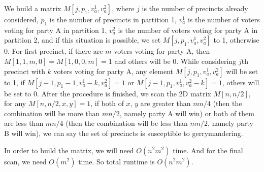 \documentclass[letter,12pt]{article}
\begin{document}
We build a matrix $M[j, p_1, v_a^1, v_a^2]$, where $j$ is the number of
precincts already considered, $p_1$ is the number of precincts in partition
1, $v_a^1$ is the number of voters voting for party A in partition 1,  
$v_a^2$ is the number of voters voting for party A in partition 2, and if
this situation is possible, we set $M[j, p_1, v_a^1, v_a^2]$ to 1, otherwise
0. For first precinct, if there are $m$ voters voting for party A, then 
$M[1, 1, m, 0]=M[1, 0, 0, m] = 1$ and others will be 0. While considering
$j$th precinct with $k$ voters voting for party A, any element 
$M[j, p_1, v_a^1, v_a^2]$ will be set to 1, if $M[j-1, p_1-1,v_a^1-k, 
v_a^2]=1$ or $M[j-1,p_1, v_a^1,v_a^2-k]=1$, others will be set to 0.
After the procedure is finished, we scan the 2D matrix $M[n,n/2]$, for any
$M[n,n/2, x, y] = 1$, if both of $x$, $y$ are greater than $mn/4$ 
(then the combination will be more than $mn/2$, namely party A will win) or 
both of them are less than $mn/4$ (then the combination will be less than 
$mn/2$, namely party B will win), we can say the set of precincts is 
susceptible to gerrymandering.

In order to build the matrix, we will need $O(n^2m^2)$ time. And for the
final scan, we need $O(m^2)$ time. So total runtime is $O(n^2m^2)$.
\end{document}

